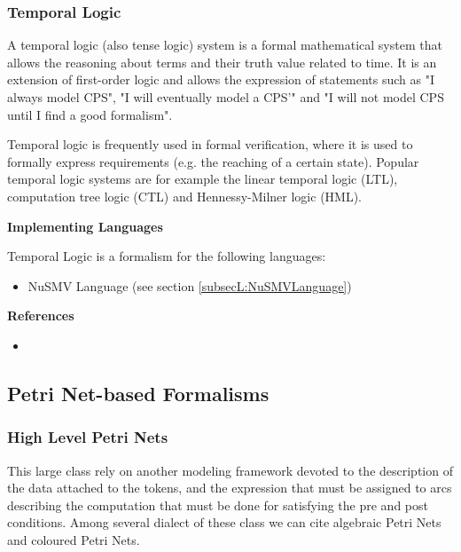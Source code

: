 \subsubsection{Temporal Logic}
\label{subsecF:TemporalLogic}


A temporal logic (also tense logic) system is a formal mathematical system that allows the reasoning about terms and their truth value related to time. It is an extension of first-order logic and allows the expression of statements such as "I always model CPS", "I will eventually model a CPS'" and "I will not model CPS until I find a good formalism". 

Temporal logic is frequently used in formal verification, where it is used to formally express requirements (e.g. the reaching of a certain state). Popular temporal logic systems are for example the linear temporal logic (LTL), computation tree logic (CTL) and Hennessy-Milner logic (HML).

\textbf{Implementing Languages}

Temporal Logic is a formalism for the following languages:
\begin{itemize}
	\item NuSMV Language (see section \ref{subsecL:NuSMVLanguage})
\end{itemize}





\textbf{References}
\begin{itemize}
	
\item {}
\end{itemize}

\subsection{Petri Net-based Formalisms}

\subsubsection{High Level Petri Nets}
\label{subsecF:PetriNetsHighLevel}


This large class rely on another modeling framework devoted to the description of the data attached to the tokens, and the expression that must be assigned to arcs describing the computation that must be done for satisfying the pre and post conditions. Among several dialect of these class we can cite algebraic Petri Nets and coloured Petri Nets.

